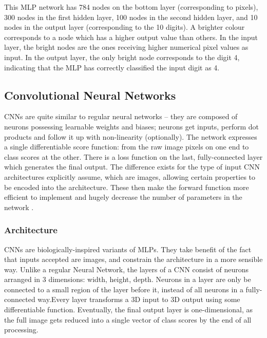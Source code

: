 This MLP network has 784 nodes on the bottom layer (corresponding to pixels), 300 nodes in the first hidden layer, 100 nodes in the second hidden layer, and 10 nodes in the output layer (corresponding to the 10 digits)\cite{harley2015isvc}. \newline\newline
A brighter colour corresponds to a node which has a higher output value than others. In the input layer, the bright nodes are the ones receiving higher numerical pixel values as input. In the output layer, the only bright node corresponds to the digit 4, indicating that the MLP has correctly classified the input digit as 4.

\subsection{Convolutional Neural Networks}
\label{sect5_1_2}
CNNs are quite similar to regular neural networks – they are composed of neurons possessing learnable weights and biases; neurons get inputs, perform dot products and follow it up with non-linearity (optionally). The network expresses a single differentiable score function: from the raw image pixels on one end to class scores at the other. There is a loss function on the last, fully-connected layer which generates the final output. The difference exists for the type of input CNN architectures explicitly assume, which are images, allowing certain properties to be encoded into the architecture. These then make the forward function more efficient to implement and hugely decrease the number of parameters in the network \cite{cnn_stanford}.

\subsubsection{Architecture}
\label{sect5_1_2_1}
CNNs are biologically-inspired variants of MLPs. They take benefit of the fact that inputs accepted are images, and constrain the architecture in a more sensible way. Unlike a regular Neural Network, the layers of a CNN consist of neurons arranged in 3 dimensions: width, height, depth. Neurons in a layer are only be connected to a small region of the layer before it, instead of all neurons in a fully-connected way.Every layer transforms a 3D input to 3D output using some differentiable function. Eventually, the final output layer is one-dimensional, as the full image gets reduced into a single vector of class scores by the end of all processing.

